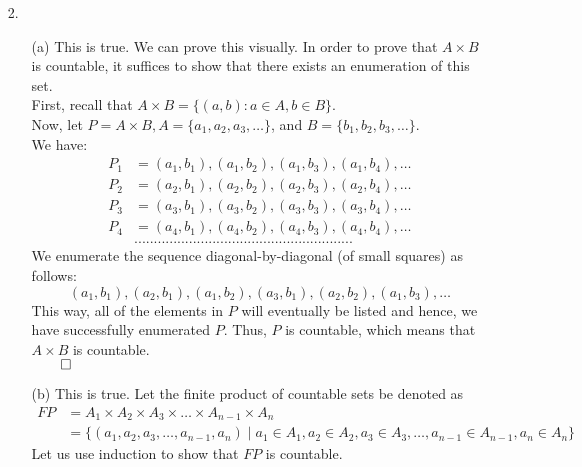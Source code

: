 \documentclass[11pt]{article}
\begin{document}
\begin{itemize}
    \item[2.]
        \begin{itemize}
            \item[(a)]
                This is true. We can prove this visually.
                In order to prove that $A \times B$ is countable, it suffices to
                show that there exists an enumeration of this set.\\
                First, recall that $A \times B = \{(a, b) : a \in A, b \in B\}$.\\
                Now, let $P = A \times B, A = \{a_1, a_2, a_3, \dots\}$, and
                $B = \{b_1, b_2, b_3, \dots\}$.\\
                We have:
                \begin{align*}
                    P_1 &= (a_1, b_1), (a_1, b_2), (a_1, b_3), (a_1, b_4), \dots\\
                    P_2 &= (a_2, b_1), (a_2, b_2), (a_2, b_3), (a_2, b_4), \dots\\
                    P_3 &= (a_3, b_1), (a_3, b_2), (a_3, b_3), (a_3, b_4), \dots\\
                    P_4 &= (a_4, b_1), (a_4, b_2), (a_4, b_3), (a_4, b_4), \dots\\
                        &........................................................
                \end{align*}
                We enumerate the sequence diagonal-by-diagonal (of small
                squares) as follows:
                $$(a_1, b_1), (a_2, b_1), (a_1, b_2), (a_3, b_1), (a_2, b_2),
                (a_1, b_3), \dots$$
                This way, all of the elements in $P$ will eventually be listed
                and hence, we have successfully enumerated $P$. Thus, $P$ is
                countable, which means that $A \times B$ is countable.\\
                $\qed$

            \item[(b)]
                This is true. Let the finite product of countable sets be
                denoted as
                \begin{align*}
                    FP &= A_1 \times A_2 \times A_3 \times \dots \times A_{n - 1} \times A_n\\
                       &= \{(a_1, a_2, a_3, \dots, a_{n - 1}, a_n) \mid a_1 \in A_1, a_2 \in A_2, a_3 \in A_3, \dots, a_{n - 1} \in A_{n - 1}, a_n \in A_n\}
                \end{align*}
                Let us use induction to show that $FP$ is countable.


\end{itemize}
\end{itemize}
\end{document}

